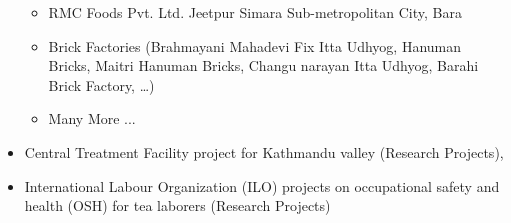 \documentclass[a4paper, 09pt]{extarticle}
\begin{document}
\begin{itemize}
\begin{itemize}
        \item RMC Foods Pvt. Ltd. Jeetpur Simara Sub-metropolitan City, Bara
        \item Brick Factories (Brahmayani Mahadevi Fix Itta Udhyog, Hanuman Bricks, Maitri Hanuman Bricks, Changu narayan Itta Udhyog, Barahi Brick Factory, \dots)
        \item Many More ...
    \end{itemize}
    \item  Central Treatment Facility project for Kathmandu valley (Research Projects),  \item International Labour Organization (ILO) projects on occupational safety and health (OSH) for tea laborers (Research Projects)



\end{itemize}
\end{document}

